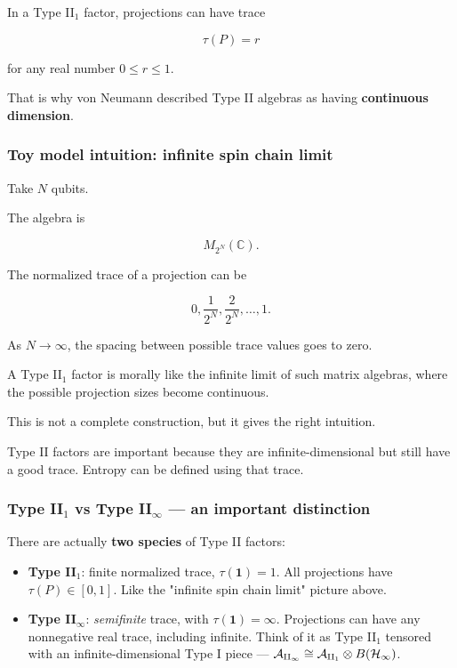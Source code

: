 \documentclass[11pt,a4paper]{article}
\begin{document}
In a Type II$_1$ factor, projections can have trace

\[
\tau(P)=r
\]

for any real number $0\leq r\leq 1$.

That is why von Neumann described Type II algebras as having \textbf{continuous dimension}.

\subsubsection{Toy model intuition: infinite spin chain limit}

Take $N$ qubits.

The algebra is

\[
M_{2^N}(\mathbb{C}).
\]

The normalized trace of a projection can be

\[
0,\frac{1}{2^N},\frac{2}{2^N},\dots,1.
\]

As $N\to\infty$, the spacing between possible trace values goes to zero.

A Type II$_1$ factor is morally like the infinite limit of such matrix algebras, where the possible projection sizes become continuous.

This is not a complete construction, but it gives the right intuition.

Type II factors are important because they are infinite-dimensional but still have a good trace. Entropy can be defined using that trace.

\subsubsection{Type II$_1$ vs Type II$_\infty$ — an important distinction}

There are actually \textbf{two species} of Type II factors:

\begin{itemize}
  \item \textbf{Type II$_1$}: finite normalized trace, $\tau(\mathbf{1}) = 1$. All projections have $\tau(P) \in [0, 1]$. Like the "infinite spin chain limit" picture above.
  \item \textbf{Type II$_\infty$}: \emph{semifinite} trace, with $\tau(\mathbf{1}) = \infty$. Projections can have any nonnegative real trace, including infinite. Think of it as Type II$_1$ tensored with an infinite-dimensional Type I piece — $\mathcal{A}_{\rm II_\infty} \cong \mathcal{A}_{\rm II_1} \otimes B(\mathcal{H}_\infty)$.
\end{itemize}
\end{document}
